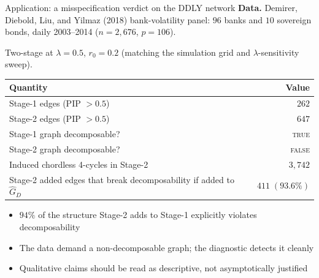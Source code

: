 \begin{frame}[t]{Application: a misspecification verdict on the DDLY network}
    \textbf{Data.} Demirer, Diebold, Liu, and Yilmaz (2018) bank-volatility panel: $96$ banks and $10$ sovereign bonds, daily 2003--2014 ($n = 2{,}676$, $p = 106$).
    \vspace{0.2cm}

    Two-stage at $\lambda = 0.5$, $r_0 = 0.2$ (matching the simulation grid and $\lambda$-sensitivity sweep).
    \vspace{0.3cm}

    \footnotesize
    \begin{table}[H]
        \centering
        \begin{tabular}{lr}
            \toprule
            Quantity & Value \\
            \midrule
            Stage-1 edges (PIP $> 0.5$)                                      & $262$ \\
            Stage-2 edges (PIP $> 0.5$)                                      & $647$ \\
            Stage-1 graph decomposable?                                      & \textsc{true} \\
            Stage-2 graph decomposable?                                      & \textsc{false} \\
            Induced chordless 4-cycles in Stage-2                            & $3{,}742$ \\
            \rowcolor{yellow!30} Stage-2 added edges that break decomposability if added to $\hat G_D$ & $411\;(93.6\%)$ \\
            \bottomrule
        \end{tabular}
    \end{table}

    \begin{itemize}
        \item $94\%$ of the structure Stage-2 adds to Stage-1 explicitly violates decomposability
        \item The data demand a non-decomposable graph; the diagnostic detects it cleanly
        \item Qualitative claims should be read as descriptive, not asymptotically justified
    \end{itemize}
\end{frame}


